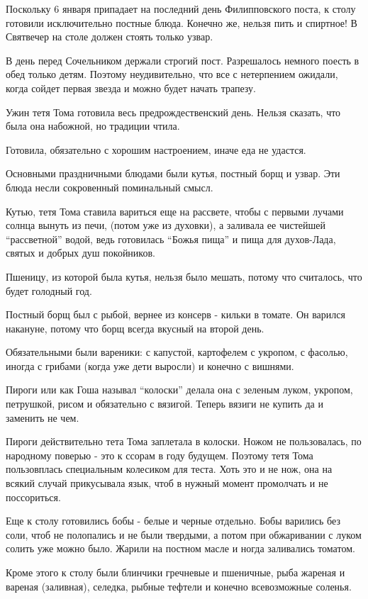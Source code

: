 Поскольку 6 января припадает на последний день Филипповского поста, к столу
готовили исключительно постные блюда. Конечно же, нельзя пить и спиртное! В
Святвечер на столе должен стоять только узвар.

В день перед Сочельником держали строгий пост. Разрешалось немного поесть в
обед только детям. Поэтому неудивительно, что все с нетерпением ожидали, когда
сойдет первая звезда и можно будет начать трапезу.

Ужин тетя Тома готовила весь предрождественский день. Нельзя сказать, что была
она набожной, но традиции чтила.

Готовила, обязательно с хорошим настроением, иначе еда не удастся.

Основными праздничными блюдами были кутья, постный борщ и узвар. Эти блюда
несли сокровенный поминальный смысл. 

Кутью, тетя Тома ставила вариться еще на рассвете, чтобы с первыми лучами
солнца вынуть из печи, (потом уже из духовки), а заливала ее чистейшей
\enquote{рассветной} водой, ведь готовилась \enquote{Божья пища} и пища для
духов-Лада, святых и добрых душ покойников.

Пшеницу, из которой была кутья, нельзя было мешать, потому что считалось, что
будет голодный год. 

Постный борщ был с рыбой, вернее из консерв - кильки в томате. Он варился
накануне, потому что борщ всегда вкусный на второй день.

Обязательными были вареники: с капустой, картофелем с укропом, с фасолью,
иногда с грибами (когда уже дети выросли) и конечно с вишнями. 

Пироги или как Гоша называл \enquote{колоски} делала она с зеленым луком,  укропом,
петрушкой, рисом и обязательно с вязигой. Теперь вязиги не купить да и заменить
не чем.

Пироги действительно тета Тома заплетала в колоски. Ножом не пользовалась, по
народному поверью - это к ссорам в году будущем. Поэтому тетя Тома пользовплась
специальным колесиком для теста. Хоть это и не нож, она на всякий случай
прикусывала язык, чтоб в нужный момент промолчать и не поссориться.

Еще к столу готовились бобы - белые и черные отдельно. Бобы варились без соли,
чтоб не полопались и не были твердыми, а потом при обжаривании с луком солить
уже можно было. Жарили на постном масле и ногда заливались томатом.

Кроме этого к столу были блинчики гречневые и пшеничные, рыба жареная и вареная
(заливная), селедка, рыбные тефтели и конечно всевозможные соленья.

